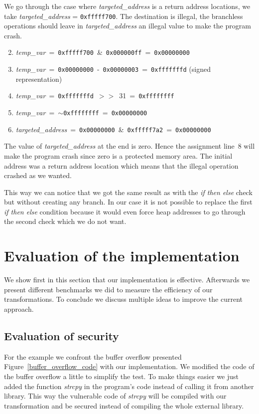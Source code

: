 \documentclass[11pt]{sdm}
\begin{document}
We go through the case where \textit{targeted\_address} is a return address locations, we take \textit{targeted\_address} = \texttt{0xfffff700}. 
The destination is illegal, the branchless operations should leave in \textit{targeted\_address} an illegal value to make the program crash.
\begin{enumerate}[noitemsep]
	\setcounter{enumi}{1}
	\item \textit{temp\_var}~=~\texttt{0xfffff700}~\&~\texttt{0x000000ff}~=~\texttt{0x00000000}
	\item \textit{temp\_var}~=~\texttt{0x00000000}~-~\texttt{0x00000003}~=~\texttt{0xfffffffd} (signed representation)
	\item \textit{temp\_var}~=~\texttt{0xfffffffd}~$>>$~31~=~\texttt{0xffffffff}
	\item \textit{temp\_var}~=~$\sim$\texttt{0xffffffff}~=~\texttt{0x00000000}
	\item \textit{targeted\_address}~=~\texttt{0x00000000}~\&~\texttt{0xfffff7a2}~=~\texttt{0x00000000}
\end{enumerate}
The value of \textit{targeted\_address} at the end is zero. Hence the assignment line~8 will make the program crash since zero is a protected memory area. The initial address was a return address location which means that the illegal operation crashed as we wanted.

This way we can notice that we got the same result as with the \textit{if then else} check but without creating any branch. In our case it is not possible to 
replace the first \textit{if then else} condition because it would even force heap addresses to go through the second check which we do not want.
\newpage

\section{Evaluation of the implementation}
We show first in this section that our implementation is effective. 
Afterwards we present different benchmarks we did to measure the efficiency of our transformations.
To conclude we discuss multiple ideas to improve the current approach.

\subsection{Evaluation of security}
For the example we confront the buffer overflow presented Figure~\ref{buffer_overflow_code} with our implementation. We modified the code of the buffer overflow a little to simplify the test. To make things easier we just added the function \textit{strcpy} in the program's code instead of calling it from another library. This way the vulnerable code of \textit{strcpy} will be compiled with our transformation and be secured instead of compiling the whole external library.
\end{document}
